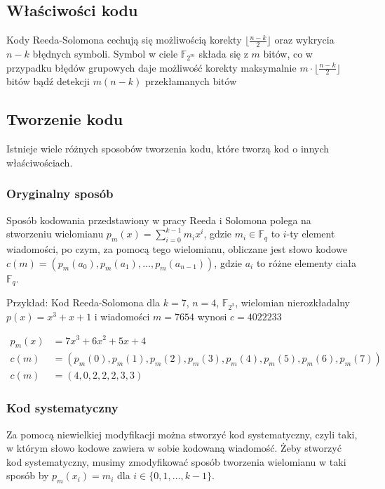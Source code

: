 \subsection{Właściwości kodu}\label{subsection:wlasciwosci}
Kody Reeda-Solomona cechują się możliwością korekty $\lfloor \frac{n-k}{2} \rfloor$
oraz wykrycia $n-k$ błędnych symboli. Symbol w ciele $\mathbb{F}_{2^m}$ składa się
z $m$ bitów, co w przypadku błędów grupowych daje możliwość korekty maksymalnie
$m \cdot \lfloor \frac{n-k}{2} \rfloor$ bitów bądź detekcji $m(n-k)$ przekłamanych
bitów

\subsection{Tworzenie kodu}
Istnieje wiele różnych sposobów tworzenia kodu, które tworzą kod o innych właściwościach.


\subsubsection{Oryginalny sposób}\label{subsection:original}
Sposób kodowania przedstawiony w pracy Reeda i Solomona polega na stworzeniu
wielomianu $p_m(x)=\sum_{i=0}^{k-1}m_{i}x^i$, gdzie $m_i\in\mathbb{F}_q$ to
$i$\nobreakdash-ty element wiadomości, po czym, za pomocą tego wielomianu,
obliczane jest słowo kodowe $c(m)=(p_m(a_0), p_m(a_1), \ldots, p_m(a_{n-1}))$,
gdzie $a_i$ to różne elementy ciała $\mathbb{F}_q$.
\newline\newline
\begin{minipage}{\textwidth}
Przykład:
\newline
Kod Reeda-Solomona dla $k=7$, $n=4$, $\mathbb{F}_{2^3}$, wielomian nierozkładalny $p(x) = x^3 + x + 1$ i wiadomości $m = 7654$ wynosi $c = 4022233$
\end{minipage}
\begin{align*}
    p_m(x) &= 7x^3 + 6x^2 + 5x + 4 \\
    c(m) &= (p_m(0), p_m(1), p_m(2), p_m(3), p_m(4), p_m(5), p_m(6), p_m(7)) \\
    c(m) &= (4, 0, 2, 2, 2, 3, 3)
\end{align*}

\subsubsection{Kod systematyczny}\label{subsection:Kod systematyczny}
Za pomocą niewielkiej modyfikacji można stworzyć kod systematyczny, czyli taki, w
którym słowo kodowe zawiera w sobie kodowaną wiadomość.
Żeby stworzyć kod systematyczny, musimy zmodyfikować sposób tworzenia wielomianu w
taki sposób by $p_m(x_i)=m_i$ dla $i \in \{0,1,\ldots,k-1\}$.

